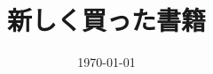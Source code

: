 \documentclass{jsarticle}
\begin{document}
\title{新しく買った書籍}
\date{\today}
\maketitle
\renewcommand{\refname}{}
\nocite{*}


\end{document}
